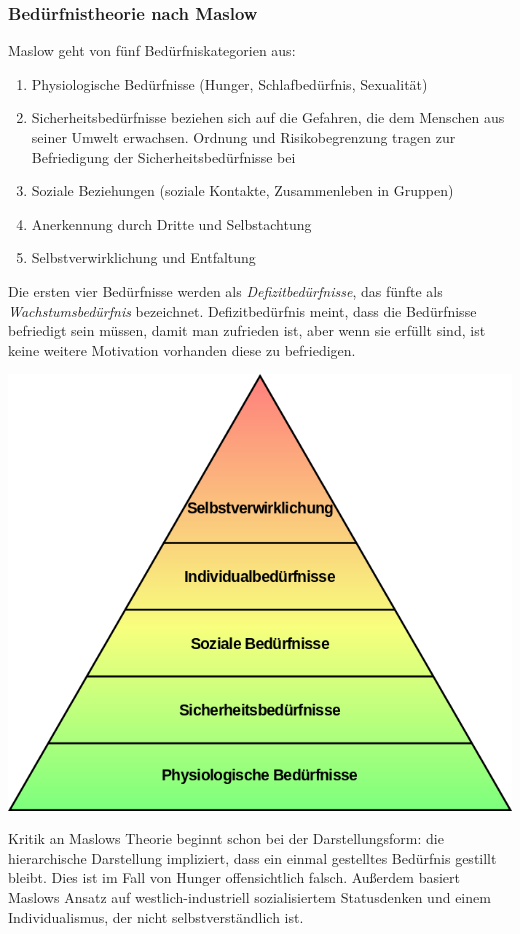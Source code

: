\subsubsection{Bedürfnistheorie nach Maslow}

Maslow geht von fünf Bedürfniskategorien aus:
\begin{enumerate}
	\item Physiologische Bedürfnisse (Hunger, Schlafbedürfnis, Sexualität)
	\item Sicherheitsbedürfnisse beziehen sich auf die Gefahren, die dem Menschen aus seiner Umwelt erwachsen. Ordnung und Risikobegrenzung tragen zur Befriedigung der Sicherheitsbedürfnisse bei
	\item Soziale Beziehungen (soziale Kontakte, Zusammenleben in Gruppen)
	\item Anerkennung durch Dritte und Selbstachtung
	\item Selbstverwirklichung und Entfaltung
\end{enumerate}

Die ersten vier Bedürfnisse werden als {\it Defizitbedürfnisse}, das fünfte als {\it Wachstumsbedürfnis} bezeichnet. Defizitbedürfnis meint, dass die Bedürfnisse befriedigt sein müssen, damit man zufrieden ist, aber wenn sie erfüllt sind, ist keine weitere Motivation vorhanden diese zu befriedigen.

\includegraphics[scale=0.3]{pictures/lf02-pic/lf02-maslow.png}

Kritik an Maslows Theorie beginnt schon bei der Darstellungsform: die hierarchische Darstellung impliziert, dass ein einmal gestelltes Bedürfnis gestillt bleibt. Dies ist im Fall von Hunger offensichtlich falsch. Außerdem basiert Maslows Ansatz auf westlich-industriell sozialisiertem Statusdenken und einem Individualismus, der nicht selbstverständlich ist.

